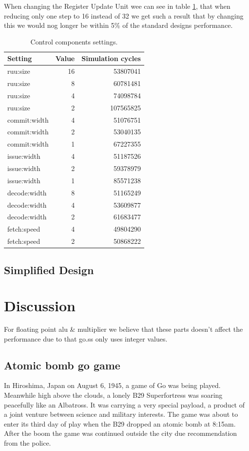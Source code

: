\documentclass[titlepage, a4paper]{article}
\begin{document}
When changing the Register Update Unit wee can see in table \ref{tab:control}, that when reducing only one step to 16 instead of 32 we get such a result that by changing this we would nog longer be within 5\% of the standard designs performance.

\begin{table}[H]
\centering
\caption{Control components settings.}

\begin{tabular}{|l|r|r|}
  \hline
  \textbf{Setting} & \textbf{Value} & \textbf{Simulation cycles}\\ \hline
  ruu:size & 16 & 53807041 \\ \hline
  ruu:size & 8 & 60781481 \\ \hline
  ruu:size & 4 & 74098784 \\ \hline
  ruu:size & 2 & 107565825 \\ \hline
  commit:width & 4 & 51076751 \\ \hline
  commit:width & 2 & 53040135 \\ \hline
  commit:width & 1 & 67227355 \\ \hline
  issue:width & 4 & 51187526 \\ \hline
  issue:width & 2 & 59378979 \\ \hline
  issue:width & 1 & 85571238 \\ \hline
  decode:width & 8 & 51165249 \\ \hline
  decode:width & 4 & 53609877 \\ \hline
  decode:width & 2 & 61683477 \\ \hline
  fetch:speed & 4 & 49804290 \\ \hline
  fetch:speed & 2 & 50868222 \\ \hline
\end{tabular}

\label{tab:control}
\end{table}

\subsection{Simplified Design}

\section{Discussion}
For floating point alu \& multiplier we believe that these parts doesn't affect the performance due to that go.ss only uses integer values.

\subsection{Atomic bomb go game}
In Hiroshima, Japan on August 6, 1945, a game of Go was being played. Meanwhile high above the clouds, a lonely B29 Superfortress was soaring peacefully like an Albatross. It was carrying a very special payload, a product of a joint venture between science and military interests. The game was about to enter its third day of play when the B29 dropped an atomic bomb at 8:15am. After the boom the game was continued outside the city due recommendation from the police.
\end{document}
